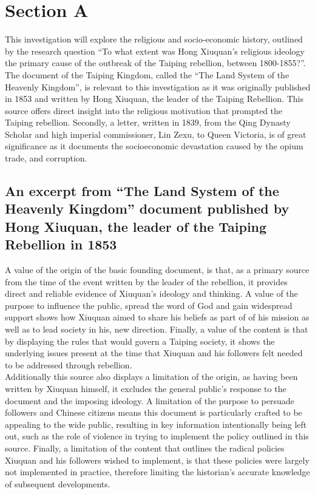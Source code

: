 







\section{Section A}

This investigation will explore the religious and socio-economic history, outlined by the research question “To what extent was Hong Xiuquan’s religious ideology the primary cause of the outbreak of the Taiping rebellion, between 1800-1855?”. \\

The document of the Taiping Kingdom, called the “The Land System of the Heavenly Kingdom”, is relevant to this investigation as it was originally published in 1853 and written by Hong Xiuquan, the leader of the Taiping Rebellion. This source offers direct insight into the religious motivation that prompted the Taiping rebellion. Secondly, a letter, written in 1839, from the Qing Dynasty Scholar and high imperial commissioner, Lin Zexu, to Queen Victoria, is of great significance as it documents the socioeconomic devastation caused by the opium trade, and corruption.


\subsection{An excerpt from “The Land System of the Heavenly Kingdom” document published by Hong Xiuquan, the leader of the Taiping Rebellion in 1853}

A value of the origin of the basic founding document, is that, as a primary source from the time of the event written by the leader of the rebellion, it provides direct and reliable evidence of Xiuquan’s ideology and thinking. A value of the purpose to influence the public, spread the word of God and gain widespread support shows how Xiuquan aimed to share his beliefs as part of of his mission as well as to lead society in his, new direction. Finally, a value of the content is that by displaying the rules that would govern a Taiping society, it shows the underlying issues present at the time that Xiuquan and his followers felt needed to be addressed through rebellion. \\

Additionally this source also displays a limitation of the origin, as having been written by Xiuquan himself, it excludes the general public’s response to the document and the imposing ideology. A limitation of the purpose to persuade followers and Chinese citizens means this document is particularly crafted to be appealing to the wide public, resulting in key information intentionally being left out, such as the role of violence in trying to implement the policy outlined in this source. Finally, a limitation of the content that outlines the radical policies Xiuquan and his followers wished to implement, is that these policies were largely not implemented in practice, therefore limiting the historian’s accurate knowledge of subsequent developments.

